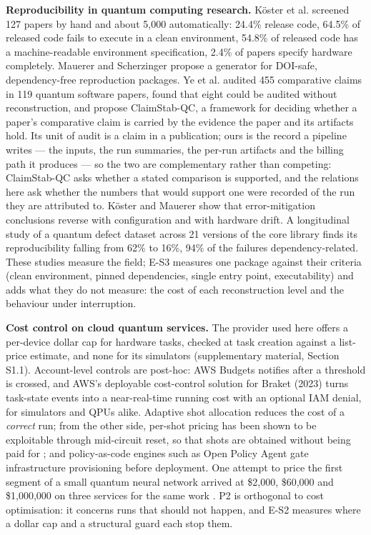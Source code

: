 \documentclass[acmsmall,screen,review]{acmart}
\begin{document}
\textbf{Reproducibility in quantum computing research.} K\"{o}ster et al. \cite{ref26} screened 127 papers by hand and about 5,000 automatically: 24.4\% release code, 64.5\% of released code fails to execute in a clean environment, 54.8\% of released code has a machine-readable environment specification, 2.4\% of papers specify hardware completely. Mauerer and Scherzinger \cite{ref27} propose a generator for DOI-safe, dependency-free reproduction packages. Ye et al. \cite{ref28} audited 455 comparative claims in 119 quantum software papers, found that eight could be audited without reconstruction, and propose ClaimStab-QC, a framework for deciding whether a paper's comparative claim is carried by the evidence the paper and its artifacts hold. Its unit of audit is a claim in a publication; ours is the record a pipeline writes --- the inputs, the run summaries, the per-run artifacts and the billing path it produces --- so the two are complementary rather than competing: ClaimStab-QC asks whether a stated comparison is supported, and the relations here ask whether the numbers that would support one were recorded of the run they are attributed to. K\"{o}ster and Mauerer \cite{ref29} show that error-mitigation conclusions reverse with configuration and with hardware drift. A longitudinal study of a quantum defect dataset across 21 versions of the core library \cite{ref30} finds its reproducibility falling from 62\% to 16\%, 94\% of the failures dependency-related. These studies measure the field; E-S3 measures one package against their criteria (clean environment, pinned dependencies, single entry point, executability) and adds what they do not measure: the cost of each reconstruction level and the behaviour under interruption.


\textbf{Cost control on cloud quantum services.} The provider used here offers a per-device dollar cap for hardware tasks, checked at task creation against a list-price estimate, and none for its simulators \cite{ref31} (supplementary material, Section S1.1). Account-level controls are post-hoc: AWS Budgets \cite{ref32} notifies after a threshold is crossed, and AWS's deployable cost-control solution for Braket \cite{ref33} (2023) turns task-state events into a near-real-time running cost with an optional IAM denial, for simulators and QPUs alike. Adaptive shot allocation \cite{ref34} reduces the cost of a \textit{correct} run; from the other side, per-shot pricing has been shown to be exploitable through mid-circuit reset, so that shots are obtained without being paid for \cite{ref35}; and policy-as-code engines such as Open Policy Agent \cite{ref36} gate infrastructure provisioning before deployment. One attempt to price the first segment of a small quantum neural network arrived at \$2,000, \$60,000 and \$1,000,000 on three services for the same work \cite{ref37}. P2 is orthogonal to cost optimisation: it concerns runs that should not happen, and E-S2 measures where a dollar cap and a structural guard each stop them.
\end{document}
